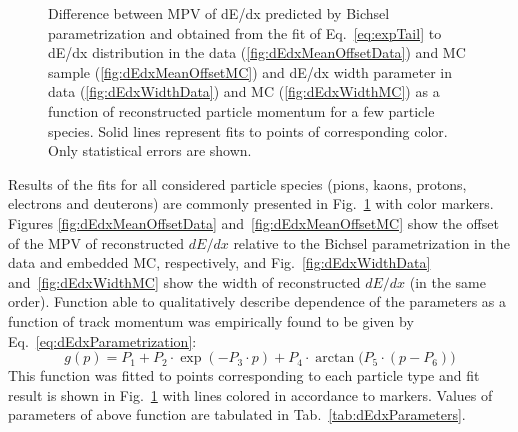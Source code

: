 \begin{figure}[hb!]
{}\vspace{-5pt}%
\caption[Parameters of reconstructed track dE/dx as a function of reconstructed momentum for a few particle species.]{Difference between MPV of dE/dx predicted by Bichsel parametrization and obtained from the fit of Eq.~\eqref{eq:expTail} to dE/dx distribution in the data (\ref{fig:dEdxMeanOffsetData}) and MC sample (\ref{fig:dEdxMeanOffsetMC}) and dE/dx width parameter in data (\ref{fig:dEdxWidthData}) and MC (\ref{fig:dEdxWidthMC}) as a function of reconstructed particle momentum for a few particle species. Solid lines represent fits to points of corresponding color. Only statistical errors are shown.}\label{fig:dEdxParameters}
\end{figure}


Results of the fits for all considered particle species (pions, kaons, protons, electrons and deuterons) are commonly presented in Fig.~\ref{fig:dEdxParameters} with color markers. Figures \ref{fig:dEdxMeanOffsetData} and~\ref{fig:dEdxMeanOffsetMC} show the offset of the MPV of reconstructed $dE/dx$ relative to the Bichsel parametrization in the data and embedded MC, respectively, and Fig.~\ref{fig:dEdxWidthData} and~\ref{fig:dEdxWidthMC} show the width of reconstructed $dE/dx$ (in the same order). Function able to qualitatively describe dependence of the parameters as a function of track momentum was empirically found to be given by Eq.~\eqref{eq:dEdxParametrization}:
%
\begin{equation}\label{eq:dEdxParametrization}
	g(p) = P_{1} + P_{2}\cdot \exp{\left(-P_{3}\cdot p\right)} + P_{4}\cdot \arctan{\big(P_{5}\cdot(p-P_{6})\big)}
\end{equation}
%
This function was fitted to points corresponding to each particle type and fit result is shown in Fig.~\ref{fig:dEdxParameters} with lines colored in accordance to markers. Values of parameters of above function are tabulated in Tab.~\ref{tab:dEdxParameters}.

